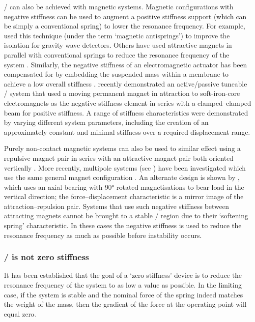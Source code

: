 \documentclass[11pt,a4paper]{memoir}
\begin{document}
\QZS/ can also be achieved with magnetic systems.
Magnetic configurations with negative stiffness can be used to augment a positive stiffness support (which can be simply a conventional spring) to lower the resonance frequency.
For example, \textcite{beccaria1997} used this technique (under the term `magnetic antisprings') to improve the isolation for gravity wave detectors.
Others have used attractive magnets in parallel with conventional springs to reduce the resonance frequency of the system \parencite{carrella2008-jsv}.
Similarly, the negative stiffness of an electromagnetic actuator has been compensated for by embedding the suspended mass within a membrane to achieve a low overall stiffness \cite{sato2001}.
\textcite{zhou2010-jsv} recently demonstrated an active/passive tuneable \qzs/ system that used a moving permanent magnet in attraction to soft-iron-core electromagnets as the negative stiffness element in series with a clamped--clamped beam for positive stiffness.
A range of stiffness characteristics were demonstrated by varying different system parameters, including the creation of an approximately constant and minimal stiffness over a required displacement range.

Purely non-contact magnetic systems can also be used to similar effect using a repulsive magnet pair in series with an attractive magnet pair both oriented vertically \cite{robertson2006-activeconf,robertson2007-icsv}.
More recently, multipole systems (see ) have been investigated which use the same general magnet configuration \cite{janssen2009-jsdd}.
An alternate design is shown by \textcite{hol2006}, which uses an axial bearing with \ang{90} rotated magnetisations to bear load in the vertical direction; the force--displacement characteristic is a mirror image of the attraction--repulsion pair.
Systems that use such negative stiffness between attracting magnets cannot be brought to a stable \qzs/ region due to their `softening spring' characteristic.
In these cases the negative stiffness is used to reduce the resonance frequency as much as possible before instability occurs.

\subsubsection{\QZS/ is not zero stiffness}

It has been established that the goal of a `zero stiffness' device is to reduce the resonance frequency of the system to as low a value as possible.
In the limiting case, if the system is stable and the nominal force of the spring indeed matches the weight of the mass, then the gradient of the force at the operating point will equal zero.
\end{document}
